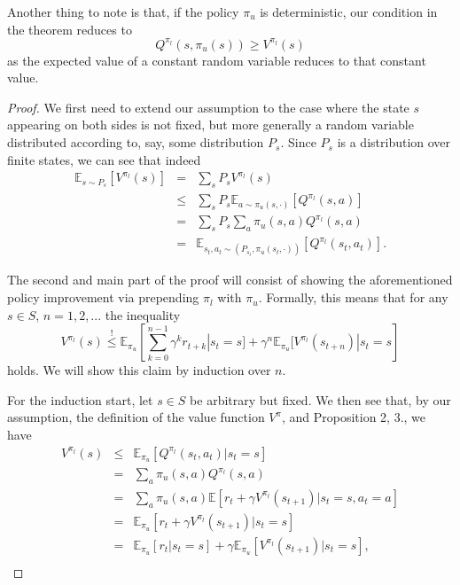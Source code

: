 \documentclass[11pt]{article} %
\begin{document}
Another thing to note is that, if the policy $\pi_u$ is deterministic, our condition in the theorem reduces to $$Q^{\pi_l}(s,\pi_u(s)) \ge V^{\pi_l}(s)$$ as the expected value of a constant random variable reduces to that constant value.

\begin{proof}
	We first need to extend our assumption to the case where the state $s$ appearing on both sides is not fixed, but more generally a random variable distributed according to, say, some distribution $P_s$. Since $P_s$ is a distribution over finite states, we can see that indeed
	\[
		\begin{array}{rll}
			\mathbb{E}_{s \sim P_s}[V^{\pi_l}(s)] & = & \sum_s P_s V^{\pi_l}(s) \\
				& \le & \sum_s P_s \mathbb{E}_{a \sim \pi_u(s,\cdot)}[Q^{\pi_l}(s,a)] \\
				& = & \sum_s P_s \sum_a \pi_u(s,a) Q^{\pi_l}(s,a) \\
				& = & \mathbb{E}_{s_t ,a_t \sim (P_{s_t},\pi_u(s_t,\cdot))}[Q^{\pi_l}(s_t,a_t)].
		\end{array}
	\]

	The second and main part of the proof will consist of showing the aforementioned policy improvement via prepending $\pi_l$ with $\pi_u$. Formally, this means that for any $s \in S$, $n = 1,2,...$ the inequality $$ V^{\pi_l}(s) \overset{!}{\le} \mathbb{E}_{\pi_u}\left[\sum_{k=0}^{n-1} \gamma^k r_{t+k} | s_t = s] + \gamma^n \mathbb{E}_{\pi_u}[V^{\pi_l}(s_{t+n}) | s_t = s\right] $$ holds. We will show this claim by induction over $n$.

	For the induction start, let $s \in S$ be arbitrary but fixed. We then see that, by our assumption, the definition of the value function $V^{\pi}$, and Proposition 2, 3., we have
	\[
		\begin{array}{rll}
			V^{\pi_l}(s) &	\le 	&	\mathbb{E}_{\pi_u}[Q^{\pi_l}(s_t,a_t) | s_t = s] \\
						&	=	&	\sum_a \pi_u(s,a) Q^{\pi_l}(s,a) \\
						&	=	&	\sum_a \pi_u(s,a) \mathbb{E}[r_t + \gamma V^{\pi_l}(s_{t+1}) | s_t = s, a_t = a]\\
						&	= 	&	\mathbb{E}_{\pi_u}[r_t + \gamma V^{\pi_l}(s_{t+1}) | s_t = s] \\
						&	=	&	\mathbb{E}_{\pi_u}[r_t | s_t = s] + \gamma \mathbb{E}_{\pi_u}[V^{\pi_l}(s_{t+1}) | s_t = s], \\
		\end{array}
	\]


\end{proof}
\end{document}
